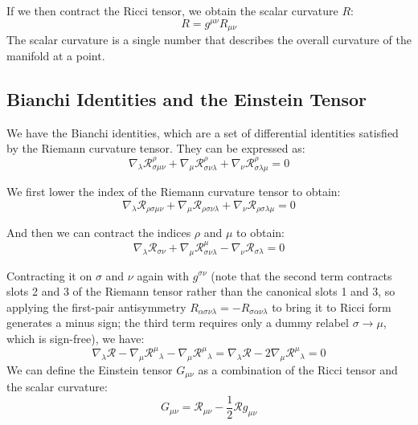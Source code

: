 \documentclass{article}
\newcommand{\Ric}{\mathcal{R}}
\begin{document}
If we then contract the Ricci tensor, we obtain the scalar curvature $R$:
\begin{equation}
R = g^{\mu\nu} R_{\mu\nu}
\end{equation}
The scalar curvature is a single number that describes the overall curvature of the manifold at a point.

\subsection{Bianchi Identities and the Einstein Tensor}
We have the Bianchi identities, which are a set of differential identities satisfied by the Riemann curvature tensor. They can be expressed as:
\begin{equation}
\nabla_\lambda \Ric^\rho_{\sigma\mu\nu} + \nabla_\mu \Ric^\rho_{\sigma\nu\lambda} + \nabla_\nu \Ric^\rho_{\sigma\lambda\mu} = 0
\end{equation}

We first lower the index of the Riemann curvature tensor to obtain:
\begin{equation}
\nabla_\lambda \Ric_{\rho\sigma\mu\nu} + \nabla_\mu \Ric_{\rho\sigma\nu\lambda} + \nabla_\nu \Ric_{\rho\sigma\lambda\mu} = 0
\end{equation}

And then we can contract the indices $\rho$ and $\mu$ to obtain:
\begin{equation}
    \nabla_\lambda\Ric_{\sigma\nu}+\nabla_\mu\Ric^\mu_{\sigma\nu\lambda}-\nabla_\nu\Ric_{\sigma\lambda}=0
\end{equation}

Contracting it on $\sigma$ and $\nu$ again with $g^{\sigma\nu}$ (note that the second term contracts slots 2 and 3 of the Riemann tensor rather than the canonical slots 1 and 3, so applying the first-pair antisymmetry $R_{\alpha\sigma\nu\lambda}=-R_{\sigma\alpha\nu\lambda}$ to bring it to Ricci form generates a minus sign; the third term requires only a dummy relabel $\sigma\to\mu$, which is sign-free), we have:
\begin{equation}
    \nabla_\lambda \Ric -\nabla_\mu\Ric^\mu{}_\lambda-\nabla_\mu\Ric^\mu{}_\lambda=\nabla_\lambda \Ric -2\nabla_\mu\Ric^\mu{}_\lambda=0
\end{equation}
We can define the Einstein tensor $G_{\mu\nu}$ as a combination of the Ricci tensor and the scalar curvature:
\begin{equation}
G_{\mu\nu} = \Ric_{\mu\nu} - \frac{1}{2} \Ric g_{\mu\nu}
\end{equation}
\end{document}
